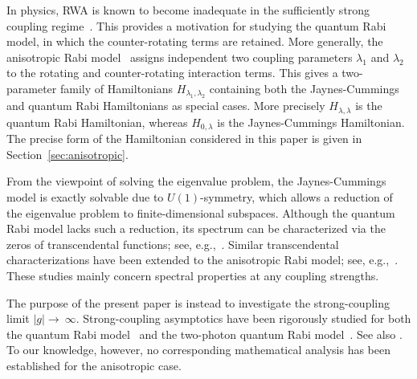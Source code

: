 \documentclass[12pt,dvipdfmx]{article}
\begin{document}
In physics, RWA is known to become inadequate in the sufficiently strong coupling regime~\cite{KMLS19, FLRKS19, LeBoite20, CT24}. This provides a motivation for studying the quantum Rabi model, in which the counter-rotating terms are retained.
More generally, the anisotropic Rabi model~\cite{XCCAF14, SYLCW14, TEPG14, ZZ15, Zhang16, ZC17, WXSSX19} assigns independent two coupling parameters $\lambda_1$ and $\lambda_2$ 
to the rotating and counter-rotating interaction terms. This gives a two-parameter family of Hamiltonians $H_{\lambda_1,\lambda_2}$ containing both the Jaynes-Cummings and quantum Rabi Hamiltonians as special cases. 
More precisely $H_{\lambda,\lambda}$ is the quantum Rabi Hamiltonian, whereas 
$H_{0,\lambda}$ is the  Jaynes-Cummings Hamiltonian. 
The precise form of the Hamiltonian considered in this paper is given in Section~\ref{sec:anisotropic}.

From the viewpoint of solving the eigenvalue problem, the Jaynes-Cummings model is exactly solvable due to $U(1)$-symmetry, which allows a reduction of the eigenvalue problem to finite-dimensional subspaces. Although the quantum Rabi model lacks such a reduction, its spectrum can be characterized via the zeros of transcendental functions; see, e.g.,~\cite{Braak11, MPS16}. Similar transcendental characterizations have been extended to the anisotropic Rabi model; see, e.g.,~\cite{XCCAF14, TEPG14}. 
These studies mainly concern spectral properties at any  coupling strengths.

The purpose of the present paper is instead to investigate the strong-coupling limit
$|g|\to~\infty$. 
Strong-coupling asymptotics have been rigorously studied for both the quantum Rabi model~\cite{Hirokawa15, HMS17, RW24, HS25a} and the two-photon quantum Rabi model~\cite{HH26}. See also \cite{bra23,nak25}. To our knowledge, however, no corresponding mathematical analysis has been established for the anisotropic case.
\end{document}
